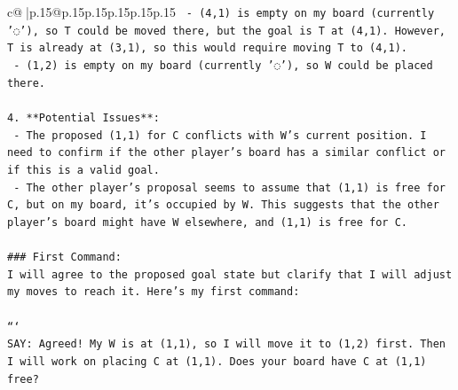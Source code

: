 \documentclass{article}
\begin{document}
{\begin{supertabular}{c@{$\;$}|p{.15\linewidth}@{}p{.15\linewidth}p{.15\linewidth}p{.15\linewidth}p{.15\linewidth}p{.15\linewidth}}
{{{\texttt{   {-} (4,1) is empty on my board (currently '◌'), so T could be moved there, but the goal is T at (4,1). However, T is already at (3,1), so this would require moving T to (4,1).} \\
\texttt{   {-} (1,2) is empty on my board (currently '◌'), so W could be placed there.} \\
\\ 
\texttt{4. **Potential Issues**:} \\
\texttt{   {-} The proposed (1,1) for C conflicts with W's current position. I need to confirm if the other player's board has a similar conflict or if this is a valid goal.} \\
\texttt{   {-} The other player's proposal seems to assume that (1,1) is free for C, but on my board, it's occupied by W. This suggests that the other player's board might have W elsewhere, and (1,1) is free for C.} \\
\\ 
\texttt{\#\#\# First Command:} \\
\texttt{I will agree to the proposed goal state but clarify that I will adjust my moves to reach it. Here's my first command:} \\
\\ 
\texttt{```} \\
\texttt{SAY: Agreed! My W is at (1,1), so I will move it to (1,2) first. Then I will work on placing C at (1,1). Does your board have C at (1,1) free?} \\
            }
        }
    }
     \\ \\


\end{supertabular}}
\end{document}
